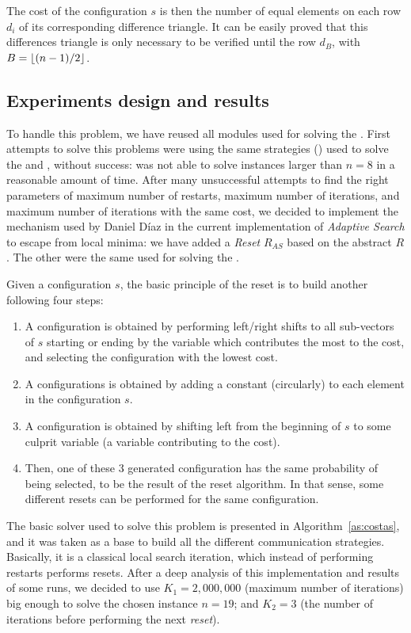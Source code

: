 The cost of the configuration $s$ is then the number of equal elements on each row $d_i$ of its corresponding difference triangle. It can be easily proved that this differences triangle is only necessary to be verified until the row $d_B$, with $B=\floor*{(n-1)/2}$.

\subsection{Experiments design and results}

To handle this problem, we have reused all modules used for solving the \nqp. First attempts to solve this problems were using the same strategies (\ass) used to solve the \sgp{} and \nqp, without success: \posl{} was not able to solve instances larger than $n = 8$ in a reasonable amount of time. %
After many unsuccessful attempts to find the right parameters of maximum number of restarts, maximum number of iterations, and maximum number of iterations with the same cost, we decided to implement the mechanism used by Daniel D\'iaz in the current implementation of {\it Adaptive Search} to escape from local minima: we have added a {\it Reset} \om{} $R_{AS}$ based on the abstract \om{} $R$. The other \oms{} were the same used for solving the \nqp.

Given a configuration $s$, the basic principle of the reset is to build another following four steps:
\begin{enumerate}
\item A configuration is obtained by performing left/right shifts to all sub-vectors of $s$ starting or ending by the variable which contributes the most to the cost, and selecting the configuration with the lowest cost.
\item A configurations is obtained by adding a constant (circularly) to each element in the configuration $s$.
\item A configuration is obtained by shifting left from the beginning of $s$ to some culprit variable (\ie a variable contributing to the cost).
\item Then, one of these 3 generated configuration has the same probability of being selected, to be the result of the reset algorithm. In that sense, some different resets can be performed for the same configuration.
\end{enumerate}

The basic solver used to solve this problem is presented in Algorithm~\ref{as:costas}, and it was taken as a base to build all the different communication strategies. Basically, it is a classical local search iteration, which instead of performing restarts performs resets. After a deep analysis of this implementation and results of some runs, we decided to use $K_1 = 2,000,000$ (maximum number of iterations) big enough to solve the chosen instance $n = 19$; and $K_2 = 3$ (the number of iterations before performing the next \textit{reset}).

